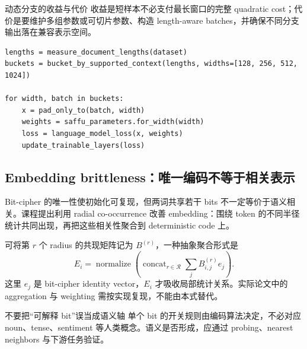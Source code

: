 
\begin{importantbox}{动态分支的收益与代价}
收益是短样本不必支付最长窗口的完整 quadratic cost；代价是要维护多组参数或可切片参数、构造 length-aware batches，并确保不同分支输出落在兼容表示空间。
\end{importantbox}

\begin{lstlisting}[caption={Length-aware dynamic context batching 伪代码}]
lengths = measure_document_lengths(dataset)
buckets = bucket_by_supported_context(lengths, widths=[128, 256, 512, 1024])

for width, batch in buckets:
    x = pad_only_to(batch, width)
    weights = saffu_parameters.for_width(width)
    loss = language_model_loss(x, weights)
    update_trainable_layers(loss)
\end{lstlisting}


\subsection{Embedding brittleness：唯一编码不等于相关表示}

Bit-cipher 的唯一性使初始化可复现，但两词共享若干 bits 不一定等价于语义相关。课程提出利用 radial co-occurrence 改善 embedding：围绕 token 的不同半径统计共同出现，再把这些相关性聚合到 deterministic code 上。


可将第 $r$ 个 radius 的共现矩阵记为 $B^{(r)}$，一种抽象聚合形式是
\[
E_i=\operatorname{normalize}\!\left(
\operatorname{concat}_{r\in\mathcal R}
\sum_j B^{(r)}_{i,j}e_j
\right).
\]
这里 $e_j$ 是 bit-cipher identity vector，$E_i$ 才吸收局部统计关系。实际论文中的 aggregation 与 weighting 需按实现复现，不能由本式替代。

\begin{warningbox}{不要把“可解释 bit”误当成语义轴}
单个 bit 的开关规则由编码算法决定，不必对应 noun、tense、sentiment 等人类概念。语义是否形成，应通过 probing、nearest neighbors 与下游任务验证。
\end{warningbox}


